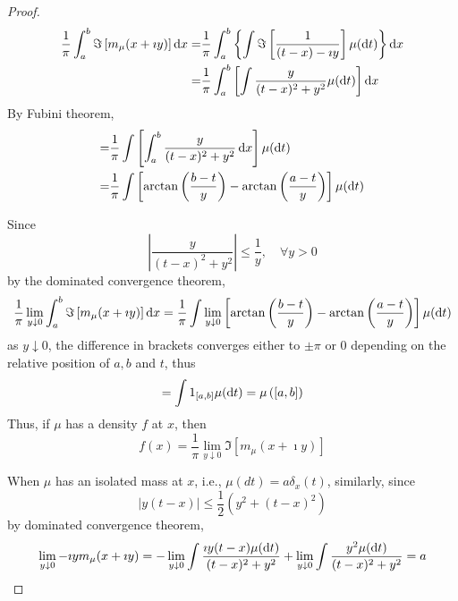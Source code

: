 \begin{proof}
	\begin{equation*}
		\begin{aligned}
			\frac{1}{\pi}\int_{a}^{b}\Im\left[m_{\mu}(x+\imath y)\right]\mathop{}\!\mathrm{d} x= & \frac{1}{\pi}\int_{a}^{b}\left\{\int\Im\left[\frac{1}{(t-x)-\imath y}\right]\mu(\mathop{}\!\mathrm{d} t)\right\}\mathop{}\!\mathrm{d} x \\
			=                                                                   & \frac{1}{\pi}\int_{a}^{b}\left[\int\frac{y}{(t-x)^{2}+y^{2}}\mu(\mathop{}\!\mathrm{d} t)\right]\mathop{}\!\mathrm{d} x
		\end{aligned}
	\end{equation*}
	By Fubini theorem,
	\begin{equation*}
		\begin{aligned}
			= & \frac{1}{\pi}\int\left[\int_{a}^{b}\frac{y}{(t-x)^{2}+y^{2}}\mathop{}\!\mathrm{d} x\right]\mu(\mathop{}\!\mathrm{d} t)                         \\
			= & \frac{1}{\pi}\int\left[\arctan\left(\frac{b-t}{y}\right)-\arctan\left(\frac{a-t}{y}\right)\right]\mu(\mathop{}\!\mathrm{d} t)
		\end{aligned}
	\end{equation*}

	Since
	\begin{equation*}
		\left|\frac{y}{(t-x)^{2}+y^{2}}\right|\leq\frac{1}{y},\quad\forall y>0
	\end{equation*}
	by the dominated convergence theorem,
	\begin{equation*}
		\frac{1}{\pi}\lim_{y\downarrow 0}\int_{a}^{b}\Im\left[m_{\mu}(x+\imath y)\right]\mathop{}\!\mathrm{d} x=\frac{1}{\pi}\int\lim_{y\downarrow 0}\left[\arctan\left(\frac{b-t}{y}\right)-\arctan\left(\frac{a-t}{y}\right)\right]\mu(\mathop{}\!\mathrm{d} t)
	\end{equation*}
	as $y\downarrow 0$, the difference in brackets converges either to $\pm \pi$ or 0 depending on the relative position of $a,b$ and $t$, thus
	\begin{equation*}
		=\int\mathrm{1}_{[a,b]}\mu(\mathop{}\!\mathrm{d} t)=\mu\left([a,b]\right)
	\end{equation*}
	Thus, if $\mu$ has a density $f$ at $x$, then
	\begin{equation*}
		f(x)=\frac{1}{\pi}\lim_{y\downarrow 0}\Im\left[m_{\mu}(x+\imath y)\right]
	\end{equation*}

	When $\mu$ has an isolated mass at $x$, i.e., $\mu(d t)=a \delta_{x}(t)$, similarly, since
	\begin{equation*}
		|y(t-x)|\leq\frac{1}{2}\left(y^{2}+(t-x)^{2}\right)
	\end{equation*}
	by dominated convergence theorem,
	\begin{equation*}
		\lim_{y\downarrow 0}-\imath ym_{\mu}(x+\imath y)=-\lim_{y\downarrow 0}\int\frac{\imath y(t-x)\mu(\mathop{}\!\mathrm{d} t)}{(t-x)^{2}+y^{2}}+\lim_{y\downarrow 0}\int\frac{y^{2}\mu(\mathop{}\!\mathrm{d} t)}{(t-x)^{2}+y^{2}}=a
	\end{equation*}
\end{proof}

